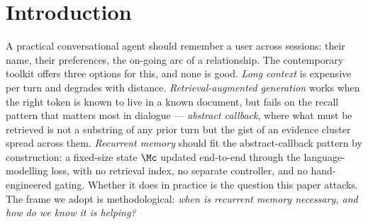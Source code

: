 %
%

\section{Introduction}
\label{sec:intro}

A practical conversational agent should remember a user across
sessions: their name, their preferences, the on-going arc of a
relationship. The contemporary toolkit offers three options for
this, and none is good. \emph{Long context} is expensive per turn
and degrades with distance. \emph{Retrieval-augmented generation}
works when the right token is known to live in a known document,
but fails on the recall pattern that matters most in dialogue ---
\emph{abstract callback}, where what must be retrieved is not a
substring of any prior turn but the gist of an evidence cluster
spread across them. \emph{Recurrent memory} should fit the
abstract-callback pattern by construction: a fixed-size state
$\Mc$ updated end-to-end through the language-modelling loss, with
no retrieval index, no separate controller, and no hand-engineered
gating. Whether it does in practice is the question this paper
attacks. The frame we adopt is methodological: \emph{when is
recurrent memory necessary, and how do we know it is helping?}

